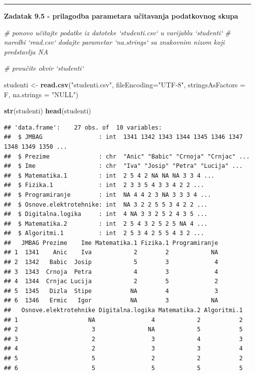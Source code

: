 \documentclass[]{book}
\newenvironment{Shaded}{\begin{snugshade}}{\end{snugshade}}
\newcommand{\KeywordTok}[1]{\textcolor[rgb]{0.13,0.29,0.53}{\textbf{#1}}}
\newcommand{\DataTypeTok}[1]{\textcolor[rgb]{0.13,0.29,0.53}{#1}}
\newcommand{\StringTok}[1]{\textcolor[rgb]{0.31,0.60,0.02}{#1}}
\newcommand{\CommentTok}[1]{\textcolor[rgb]{0.56,0.35,0.01}{\textit{#1}}}
\newcommand{\NormalTok}[1]{#1}
\theoremstyle{definition}
\theoremstyle{definition}
\theoremstyle{definition}
\theoremstyle{remark}
\begin{document}
\begin{center}\rule{0.5\linewidth}{\linethickness}\end{center}

\textbf{Zadatak 9.5 - prilagodba parametara učitavanja podatkovnog
skupa}

\begin{Shaded}
\begin{Highlighting}[]
\CommentTok{# ponovo učitajte podatke iz datoteke `studenti.csv` u varijablu `studenti`}
\CommentTok{# naredbi `read.csv` dodajte parametar `na.strings` sa znakovnim nizom koji predstavlja NA}


\CommentTok{# proučite okvir `studenti`}
\end{Highlighting}
\end{Shaded}

\begin{Shaded}
\begin{Highlighting}[]
\NormalTok{studenti <-}\StringTok{ }\KeywordTok{read.csv}\NormalTok{(}\StringTok{"studenti.csv"}\NormalTok{, }\DataTypeTok{fileEncoding=}\StringTok{"UTF-8"}\NormalTok{, }\DataTypeTok{stringsAsFactors =}\NormalTok{ F, }\DataTypeTok{na.strings =} \StringTok{"NULL"}\NormalTok{)}


\KeywordTok{str}\NormalTok{(studenti)}
\KeywordTok{head}\NormalTok{(studenti)}
\end{Highlighting}
\end{Shaded}

\begin{verbatim}
## 'data.frame':    27 obs. of  10 variables:
##  $ JMBAG                : int  1341 1342 1343 1344 1345 1346 1347 1348 1349 1350 ...
##  $ Prezime              : chr  "Anic" "Babic" "Crnoja" "Crnjac" ...
##  $ Ime                  : chr  "Iva" "Josip" "Petra" "Lucija" ...
##  $ Matematika.1         : int  2 5 4 2 NA NA NA 3 3 4 ...
##  $ Fizika.1             : int  2 3 3 5 4 3 3 4 2 2 ...
##  $ Programiranje        : int  NA 4 4 2 3 NA 3 3 3 4 ...
##  $ Osnove.elektrotehnike: int  NA 3 2 2 5 5 3 4 2 2 ...
##  $ Digitalna.logika     : int  4 NA 3 3 2 5 2 4 3 5 ...
##  $ Matematika.2         : int  2 5 4 3 2 5 2 5 NA 4 ...
##  $ Algoritmi.1          : int  2 5 3 4 2 5 5 4 3 2 ...
##   JMBAG Prezime    Ime Matematika.1 Fizika.1 Programiranje
## 1  1341    Anic    Iva            2        2            NA
## 2  1342   Babic  Josip            5        3             4
## 3  1343  Crnoja  Petra            4        3             4
## 4  1344  Crnjac Lucija            2        5             2
## 5  1345   Dizla  Stipe           NA        4             3
## 6  1346   Ermic   Igor           NA        3            NA
##   Osnove.elektrotehnike Digitalna.logika Matematika.2 Algoritmi.1
## 1                    NA                4            2           2
## 2                     3               NA            5           5
## 3                     2                3            4           3
## 4                     2                3            3           4
## 5                     5                2            2           2
## 6                     5                5            5           5
\end{verbatim}
\end{document}
